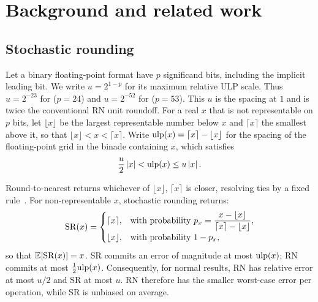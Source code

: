\section{Background and related work}
\label{sec:background}

\subsection{Stochastic rounding}

Let a binary floating-point format have $p$ significand bits, including the
implicit leading bit. We write $u = 2^{1-p}$
for its maximum relative ULP scale. Thus $u=2^{-23}$ for 
($p=24$) and $u=2^{-52}$ for  ($p=53$). This $u$ is the
spacing at $1$ and is twice the conventional RN unit roundoff. For a real $x$
that is not representable on $p$ bits, let $\lfloor x \rfloor$ be the
largest representable number below $x$ and $\lceil x \rceil$ the smallest above it, so
that $\lfloor x \rfloor < x < \lceil x \rceil$. Write $\mathrm{ulp}(x) = \lceil x \rceil - \lfloor x \rfloor$ for the
spacing of the floating-point grid in the binade containing $x$, which
satisfies~\citep{muller2018handbook}
\begin{equation}
  \frac{u}{2}\left\lvert x\right\rvert < \mathrm{ulp}(x) \le u\left\lvert x\right\rvert.
  \label{eq:ulp}
\end{equation}

Round-to-nearest returns whichever of $\lfloor x \rfloor$, $\lceil x \rceil$ is closer, resolving
ties by a fixed rule~\citep{ieee754-2019}. For non-representable $x$, stochastic rounding
returns:
\begin{equation*}
  \mathrm{SR}(x) =
  \begin{cases}
    \lceil x \rceil, & \text{with probability } p_x = \dfrac{x - \lfloor x \rfloor}{\lceil x \rceil - \lfloor x \rfloor}, \\[1.2ex]
    \lfloor x \rfloor, & \text{with probability } 1 - p_x,
  \end{cases}
\end{equation*}
so that $\mathbb{E}[\mathrm{SR}(x)] = x$. SR commits an error of magnitude at most
$\mathrm{ulp}(x)$; RN commits at most $\tfrac12\mathrm{ulp}(x)$. Consequently, for normal
results, RN has relative error at most $u/2$ and SR at most $u$.
RN therefore has the smaller worst-case error per operation, while
SR is unbiased on average.

